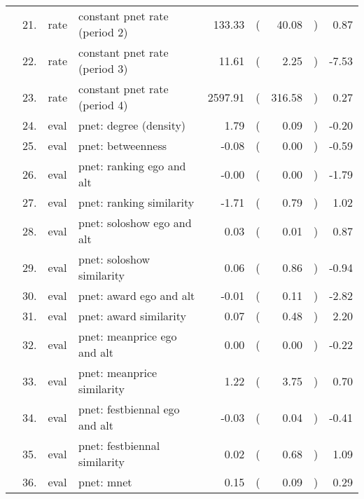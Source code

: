 \begin{table}[ht]
\begin{tabular}{llllrlrlr}
    & 21. & rate & constant pnet rate (period 2) & 133.33 & ( & 40.08 & ) & 0.87 \\ 
    & 22. & rate & constant pnet rate (period 3) & 11.61 & ( & 2.25 & ) & -7.53 \\ 
    & 23. & rate & constant pnet rate (period 4) & 2597.91 & ( & 316.58 & ) & 0.27 \\ 
    & 24. & eval & pnet: degree (density) & 1.79 & ( & 0.09 & ) & -0.20 \\ 
    & 25. & eval & pnet: betweenness & -0.08 & ( & 0.00 & ) & -0.59 \\ 
    & 26. & eval & pnet: ranking ego and alt & -0.00 & ( & 0.00 & ) & -1.79 \\ 
    & 27. & eval & pnet: ranking similarity & -1.71 & ( & 0.79 & ) & 1.02 \\ 
    & 28. & eval & pnet: soloshow ego and alt & 0.03 & ( & 0.01 & ) & 0.87 \\ 
    & 29. & eval & pnet: soloshow similarity & 0.06 & ( & 0.86 & ) & -0.94 \\ 
    & 30. & eval & pnet: award ego and alt & -0.01 & ( & 0.11 & ) & -2.82 \\ 
    & 31. & eval & pnet: award similarity & 0.07 & ( & 0.48 & ) & 2.20 \\ 
    & 32. & eval & pnet: meanprice ego and alt & 0.00 & ( & 0.00 & ) & -0.22 \\ 
    & 33. & eval & pnet: meanprice similarity & 1.22 & ( & 3.75 & ) & 0.70 \\ 
    & 34. & eval & pnet: festbiennal ego and alt & -0.03 & ( & 0.04 & ) & -0.41 \\ 
    & 35. & eval & pnet: festbiennal similarity & 0.02 & ( & 0.68 & ) & 1.09 \\ 
    & 36. & eval & pnet: mnet & 0.15 & ( & 0.09 & ) & 0.29 \\ 
   \hline
\end{tabular}
\end{table}
